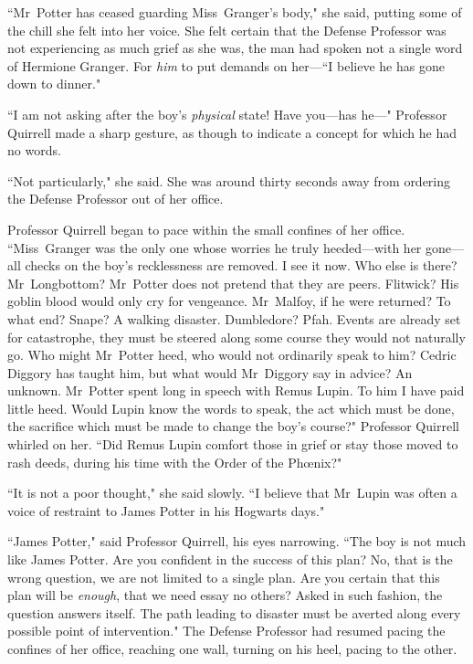 ``Mr~Potter has ceased guarding Miss~Granger's body," she said, putting some of the chill she felt into her voice. She felt certain that the Defense Professor was not experiencing as much grief as she was, the man had spoken not a single word of Hermione Granger. For \emph{him} to put demands on her—``I believe he has gone down to dinner."

``I am not asking after the boy's \emph{physical} state! Have you—has he—" Professor Quirrell made a sharp gesture, as though to indicate a concept for which he had no words.

``Not particularly," she said. She was around thirty seconds away from ordering the Defense Professor out of her office.

Professor Quirrell began to pace within the small confines of her office. ``Miss~Granger was the only one whose worries he truly heeded—with her gone—all checks on the boy's recklessness are removed. I see it now. Who else is there? Mr~Longbottom? Mr~Potter does not pretend that they are peers. Flitwick? His goblin blood would only cry for vengeance. Mr~Malfoy, if he were returned? To what end? Snape? A walking disaster. Dumbledore? Pfah. Events are already set for catastrophe, they must be steered along some course they would not naturally go. Who might Mr~Potter heed, who would not ordinarily speak to him? Cedric Diggory has taught him, but what would Mr~Diggory say in advice? An unknown. Mr~Potter spent long in speech with Remus Lupin. To him I have paid little heed. Would Lupin know the words to speak, the act which must be done, the sacrifice which must be made to change the boy's course?" Professor Quirrell whirled on her. ``Did Remus Lupin comfort those in grief or stay those moved to rash deeds, during his time with the Order of the Phœnix?"

``It is not a poor thought," she said slowly. ``I believe that Mr~Lupin was often a voice of restraint to James Potter in his Hogwarts days."

``James Potter," said Professor Quirrell, his eyes narrowing. ``The boy is not much like James Potter. Are you confident in the success of this plan? No, that is the wrong question, we are not limited to a single plan. Are you certain that this plan will be \emph{enough}, that we need essay no others? Asked in such fashion, the question answers itself. The path leading to disaster must be averted along every possible point of intervention." The Defense Professor had resumed pacing the confines of her office, reaching one wall, turning on his heel, pacing to the other.

